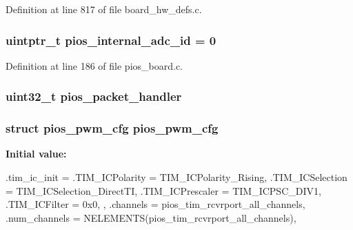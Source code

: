 \-Definition at line 817 of file board\-\_\-hw\-\_\-defs.\-c.

\hypertarget{group___revo_mini_gafb354658d0ba22815d8632d97c062c0b}{
\subsubsection[{pios\-\_\-internal\-\_\-adc\-\_\-id}]{\setlength{\rightskip}{0pt plus 5cm}uintptr\-\_\-t {\bf pios\-\_\-internal\-\_\-adc\-\_\-id} = 0}}\label{group___revo_mini_gafb354658d0ba22815d8632d97c062c0b}


\-Definition at line 186 of file pios\-\_\-board.\-c.

\hypertarget{group___revo_mini_gab0199d5aedb7be35cb1d6880ee21f8ac}{
\subsubsection[{pios\-\_\-packet\-\_\-handler}]{\setlength{\rightskip}{0pt plus 5cm}uint32\-\_\-t {\bf pios\-\_\-packet\-\_\-handler}}}\label{group___revo_mini_gab0199d5aedb7be35cb1d6880ee21f8ac}
\hypertarget{group___revo_mini_ga7587f8e174df90bef8cec1edfa9e14c1}{
\subsubsection[{pios\-\_\-pwm\-\_\-cfg}]{\setlength{\rightskip}{0pt plus 5cm}struct {\bf pios\-\_\-pwm\-\_\-cfg} {\bf pios\-\_\-pwm\-\_\-cfg}}}\label{group___revo_mini_ga7587f8e174df90bef8cec1edfa9e14c1}
{\bfseries \-Initial value\-:}
\begin{DoxyCode}
 {
        .tim_ic_init = {
                .TIM_ICPolarity = TIM_ICPolarity_Rising,
                .TIM_ICSelection = TIM_ICSelection_DirectTI,
                .TIM_ICPrescaler = TIM_ICPSC_DIV1,
                .TIM_ICFilter = 0x0,
        },
        .channels = pios_tim_rcvrport_all_channels,
        .num_channels = NELEMENTS(pios_tim_rcvrport_all_channels),
}
\end{DoxyCode}


